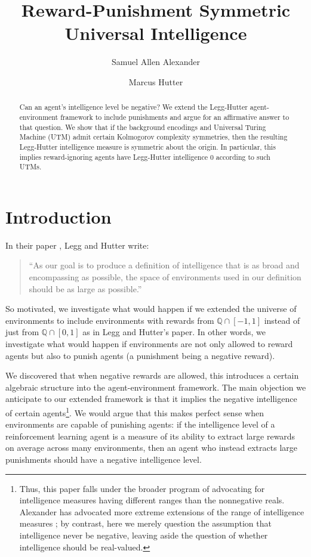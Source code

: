 \documentclass[runningheads]{llncs}
\title{Reward-Punishment Symmetric Universal Intelligence}
\author{Samuel Allen Alexander\inst{1}\orcidID{0000-0002-7930-110X}
\and
Marcus Hutter\inst{2}\orcidID{0000-0002-3263-4097}}
\institute{The U.S.\ Securities and Exchange Commission
\email{samuelallenalexander@gmail.com}
\url{https://philpeople.org/profiles/samuel-alexander/publications}
\and
Google DeepMind
\email{marcus.hutter@anu.edu.au}
\url{http://www.hutter1.net/}
}
\begin{document}
\maketitle

\begin{abstract}
    Can an agent's intelligence level be negative?
    We extend the Legg-Hutter agent-environment framework to include punishments
    and argue for an affirmative answer to that question.
    We show that if the background encodings and Universal Turing Machine (UTM) admit
    certain Kolmogorov complexity symmetries,
    then the resulting Legg-Hutter intelligence measure is symmetric about
    the origin. In particular, this implies reward-ignoring agents
    have Legg-Hutter intelligence $0$ according to such UTMs.
\end{abstract}

\section{Introduction}

In their paper \cite{legg2007universal}, Legg and Hutter write:
\begin{quote}
    ``As our goal is to produce a definition of intelligence that is as broad and
    encompassing as possible, the space of environments used in our definition should
    be as large as possible.''
\end{quote}
So motivated, we investigate what would happen if we extended the universe
of environments to include environments with rewards from $\mathbb Q\cap [-1,1]$
instead of just from $\mathbb Q\cap [0,1]$ as in Legg and Hutter's paper.
In other words, we investigate what would happen if environments are not only
allowed to reward agents but also to punish agents (a punishment being a negative
reward).

We discovered that when negative rewards are allowed, this
introduces a certain algebraic structure into the agent-environment framework. The
main objection we anticipate to our extended framework
is that it implies the negative intelligence of certain
agents\footnote{Thus, this paper falls under the broader
program of advocating for intelligence measures having different ranges than
the nonnegative reals. Alexander has advocated
more extreme extensions of the range of intelligence measures
\cite{alexander2020archimedean} \cite{alexander2021measuring}; by contrast,
here we merely question the
assumption that intelligence never be negative, leaving aside the
question of whether intelligence should be real-valued.}.
We would argue that this makes perfect sense when environments are capable of punishing
agents: if the intelligence level of a reinforcement learning agent is a measure of
its ability to extract large rewards on average across many environments, then
an agent who instead extracts large punishments should have a negative intelligence level.
\end{document}
